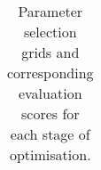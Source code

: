 \begin{landscape}
\begin{table}[ht]
\begin{tabular}{ |l|l|l|l|c|c|c|c|c|c|c|c| }
                
                \end{tabular}
            \caption{Parameter selection grids and corresponding evaluation scores for each stage of optimisation.}
            \label{fig:exp-clf-opt-summ-tbl}
        \end{table}
    \end{landscape}